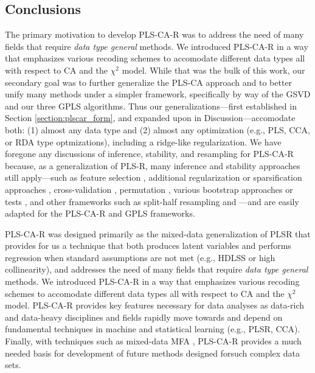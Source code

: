 \documentclass[12pt]{article}
\begin{document}
\hypertarget{conclusions}{%
\subsection{Conclusions}\label{conclusions}}

The primary motivation to develop PLS-CA-R was to address the need of
many fields that require \textit{data type general} methods. We
introduced PLS-CA-R in a way that emphasizes various recoding schemes to
accomodate different data types all with respect to CA and the
\(\chi^2\) model. While that was the bulk of this work, our secondary
goal was to further generalize the PLS-CA approach and to better unify
many methods under a simpler framework, specifically by way of the GSVD
and our three GPLS algorithms. Thus our generalizations---first
established in Section \ref{section:plscar_form}, and expanded upon in
Discussion---accomodate both: (1) almost any data type and (2) almost
any optimization (e.g., PLS, CCA, or RDA type optmizations), including a
ridge-like regularization. We have foregone any discussions of
inference, stability, and resampling for PLS-CA-R because, as a
generalization of PLS-R, many inference and stability approaches still
apply---such as feature selection \citep{sutton_sparse_2018}, additional
regularization or sparsification approaches
\citep{le_floch_significant_2012-1, guillemot2019constrained, tenenhaus_variable_2014, tenenhaus_regularized_2011},
cross-validation
\citep{wold_principal_1987, rodriguez-perez_overoptimism_2018, kvalheim_number_2019, abdi_partial_2010-1},
permutation \citep{berry_permutation_2011}, various bootstrap
\citep{efron_bootstrap_1979, chernick_bootstrap_2008} approaches
\citep{abdi_partial_2010-1, takane_regularized_2009-1} or tests
\citep{mcintosh_partial_2004, krishnan_partial_2011}, and other
frameworks such as split-half resampling
\citep{strother_quantitative_2002-1, kovacevic2013revisiting, strother2004optimizing}
and ---and are easily adapted for the PLS-CA-R and GPLS frameworks.

PLS-CA-R was designed primarily as the mixed-data generalization of PLSR
that provides for us a technique that both produces latent variables and
performs regression when standard assumptions are not met (e.g., HDLSS
or high collinearity), and addresses the need of many fields that
require \textit{data type general} methods. We introduced PLS-CA-R in a
way that emphasizes various recoding schemes to accomodate different
data types all with respect to CA and the \(\chi^2\) model. PLS-CA-R
provides key features necessary for data analyses as data-rich and
data-heavy disciplines and fields rapidly move towards and depend on
fundamental techniques in machine and statistical learning (e.g., PLSR,
CCA). Finally, with techniques such as mixed-data MFA
\citep{becue-bertaut_multiple_2008}, PLS-CA-R provides a much needed
basis for development of future methods designed forsuch complex data
sets.
\end{document}
